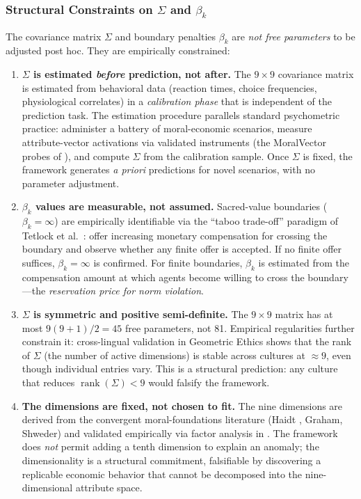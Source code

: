 \documentclass[12pt]{article}
\theoremstyle{definition}
\theoremstyle{remark}
\begin{document}
\subsubsection{Structural Constraints on $\Sigma$ and $\beta_k$}

The covariance matrix $\Sigma$ and boundary penalties $\beta_k$ are \emph{not free parameters} to be adjusted post hoc.  They are empirically constrained:

\begin{enumerate}
    \item \textbf{$\Sigma$ is estimated \emph{before} prediction, not after.}  The $9 \times 9$ covariance matrix is estimated from behavioral data (reaction times, choice frequencies, physiological correlates) in a \emph{calibration phase} that is independent of the prediction task.  The estimation procedure parallels standard psychometric practice: administer a battery of moral-economic scenarios, measure attribute-vector activations via validated instruments (the MoralVector probes of \cite{bond2026geometric}), and compute $\Sigma$ from the calibration sample.  Once $\Sigma$ is fixed, the framework generates \emph{a priori} predictions for novel scenarios, with no parameter adjustment.

    \item \textbf{$\beta_k$ values are measurable, not assumed.}  Sacred-value boundaries ($\beta_k = \infty$) are empirically identifiable via the ``taboo trade-off'' paradigm of Tetlock et al.\ \cite{tetlock2000}: offer increasing monetary compensation for crossing the boundary and observe whether any finite offer is accepted.  If no finite offer suffices, $\beta_k = \infty$ is confirmed.  For finite boundaries, $\beta_k$ is estimated from the compensation amount at which agents become willing to cross the boundary---the \emph{reservation price for norm violation}.

    \item \textbf{$\Sigma$ is symmetric and positive semi-definite.}  The $9 \times 9$ matrix has at most $9(9+1)/2 = 45$ free parameters, not 81.  Empirical regularities further constrain it: cross-lingual validation in Geometric Ethics \cite{bond2026geometric} shows that the rank of $\Sigma$ (the number of active dimensions) is stable across cultures at $\approx 9$, even though individual entries vary.  This is a structural prediction: any culture that reduces $\operatorname{rank}(\Sigma) < 9$ would falsify the framework.

    \item \textbf{The dimensions are fixed, not chosen to fit.}  The nine dimensions are derived from the convergent moral-foundations literature (Haidt \cite{haidt2012}, Graham, Shweder) and validated empirically via factor analysis in \cite{bond2026geometric}.  The framework does \emph{not} permit adding a tenth dimension to explain an anomaly; the dimensionality is a structural commitment, falsifiable by discovering a replicable economic behavior that cannot be decomposed into the nine-dimensional attribute space.
\end{enumerate}
\end{document}
